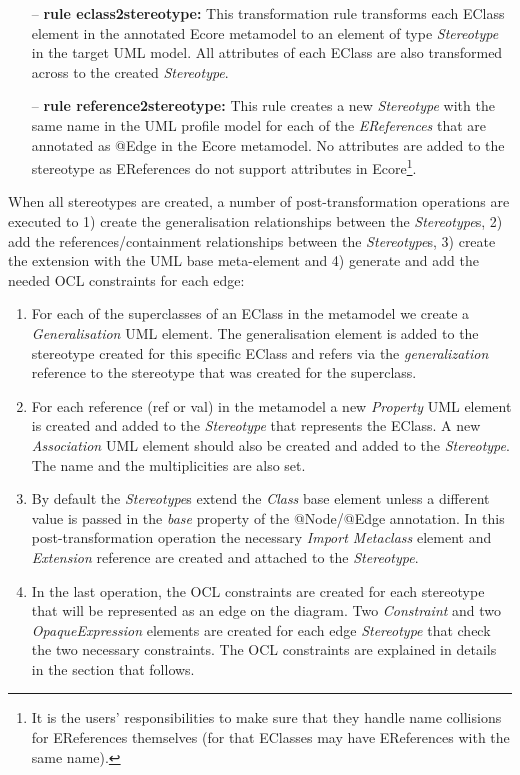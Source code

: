 \begin{itemize}
	\item[--] \textbf{rule eclass2stereotype:} This transformation rule transforms each EClass element in the annotated Ecore metamodel to an element of type \textit{Stereotype} in the target UML model. 
	All attributes of each EClass are also transformed across to the created \textit{Stereotype}. 
	\item[--] \textbf{rule reference2stereotype:} This rule creates a new \textit{Stereotype} with the same name in the UML profile model for each of the \textit{EReferences} that are annotated as @Edge in the Ecore metamodel. 
	No attributes are added to the stereotype as EReferences do not support attributes in Ecore\footnote{It is the users' responsibilities to make sure that they handle name collisions for EReferences themselves (for that EClasses may have EReferences with the same name).}.
\end{itemize}

When all stereotypes are created, a number of post-transformation operations are executed to 1) create the generalisation relationships between the \textit{Stereotype}s, 2) add the references/containment relationships between the \textit{Stereotype}s, 3) create the extension with the UML base meta-element and 4) generate and add the needed OCL constraints for each edge: 

\begin{enumerate}[label=\arabic*)]
	\item For each of the superclasses of an EClass in the metamodel we create a \textit{Generalisation} UML element. 
	The generalisation element is added to the stereotype created for this specific EClass and refers via the \textit{generalization} reference to the stereotype that was created for the superclass.
	\item For each reference (ref or val) in the metamodel a new \textit{Property} UML element is created and added to the \textit{Stereotype} that represents the EClass. 
	A new \textit{Association} UML element should also be created and added to the \textit{Stereotype}. The name and the multiplicities are also set.
	\item By default the \textit{Stereotype}s extend the \textit{Class} base element unless a different value is passed in the \textit{base} property of the @Node/@Edge annotation. 
	In this post-transformation operation the necessary \textit{Import Metaclass} element and \textit{Extension} reference are created and attached to the \textit{Stereotype}.
	\item In the last operation, the OCL constraints are created for each stereotype that will be represented as an edge on the diagram. 
	Two \textit{Constraint} and two \textit{OpaqueExpression} elements are created for each edge \textit{Stereotype} that check the two necessary constraints. 
	The OCL constraints are explained in details in the section that follows.
\end{enumerate}

